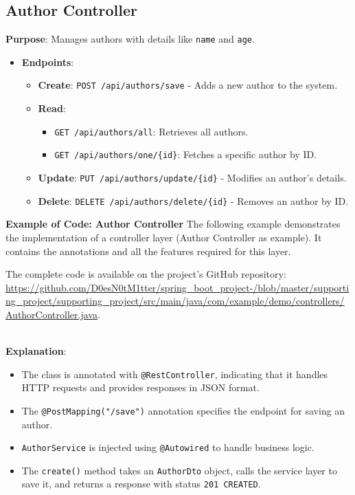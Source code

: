 \documentclass[a4paper,12pt]{article}
\begin{document}
\subsection{Author Controller}
\textbf{Purpose}: Manages authors with details like \texttt{name} and \texttt{age}.
\begin{itemize}
    \item \textbf{Endpoints}:
    \begin{itemize}
        \item \textbf{Create}: \texttt{POST /api/authors/save} - Adds a new author to the system.
        \item \textbf{Read}:
        \begin{itemize}
            \item \texttt{GET /api/authors/all}: Retrieves all authors.
            \item \texttt{GET /api/authors/one/\{id\}}: Fetches a specific author by ID.
        \end{itemize}
        \item \textbf{Update}: \texttt{PUT /api/authors/update/\{id\}} - Modifies an author's details.
        \item \textbf{Delete}: \texttt{DELETE /api/authors/delete/\{id\}} - Removes an author by ID.
    \end{itemize}
\end{itemize}

\textbf{Example of Code: Author Controller}
The following example demonstrates the implementation of a controller layer (Author Controller as example).
It contains the annotations and all the features required for this layer.

The complete code is available on the project's GitHub repository: 
\hspace{5}\\

\url{https://github.com/D0esN0tM1tter/spring_boot_project-/blob/master/supporting_project/supporting_project/src/main/java/com/example/demo/controllers/AuthorController.java}.

\vspace{0.5cm}\\

\textbf{Explanation}:
\begin{itemize}
    \item The class is annotated with \texttt{@RestController}, indicating that it handles HTTP requests and provides responses in JSON format.
    \item The \texttt{@PostMapping("/save")} annotation specifies the endpoint for saving an author.
    \item \texttt{AuthorService} is injected using \texttt{@Autowired} to handle business logic.
    \item The \texttt{create()} method takes an \texttt{AuthorDto} object, calls the service layer to save it, and returns a response with status \texttt{201 CREATED}.
\end{itemize}
\end{document}
